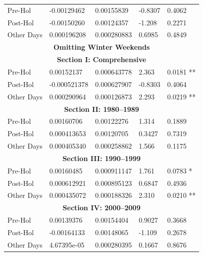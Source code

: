 \documentclass[11pt, english]{article}
\begin{document}
\begin{center}
\begin{longtable}{p{2cm}p{2cm}p{2cm}p{2cm}p{2cm}}
                \hline            
                Pre-Hol & -0.00129462 & 0.00155839 & -0.8307 & 0.4062\\ 
                Post-Hol & -0.00150260 & 0.00124357 & -1.208 & 0.2271\\  
                Other Days & 0.000196208 & 0.000280883 & 0.6985 & 0.4849\\
                \hline
                \hline                                          
                \multicolumn{5}{c}{\textbf{Omitting Winter Weekends}}\\ 
                \hline
                \hline
                \multicolumn{5}{c}{\textbf{Section I: Comprehensive}}\\
                \hline
                Pre-Hol & 0.00152137 & 0.000643778 & 2.363 & 0.0181 **\\
                Post-Hol & -0.000521378 & 0.000627907 & -0.8303 & 0.4064\\
                Other Days & 0.000290964 & 0.000126873 & 2.293 & 0.0219 **\\
                \hline
                \multicolumn{5}{c}{\textbf{Section II: 1980--1989}}\\
                \hline
                Pre-Hol & 0.00160706 & 0.00122276 & 1.314 & 0.1889\\
                Post-Hol & 0.000413653 & 0.00120705 & 0.3427 & 0.7319\\  
                Other Days & 0.000405340 & 0.000258862 & 1.566 & 0.1175\\
                \hline 
                \multicolumn{5}{c}{\textbf{Section III: 1990--1999}}\\   
                \hline            
                Pre-Hol & 0.00160485 & 0.000911147 & 1.761 & 0.0783 *\\ 
                Post-Hol & 0.000612921 & 0.000895123 & 0.6847 & 0.4936\\  
                Other Days & 0.000435072 & 0.000188326 & 2.310 & 0.0210 **\\
                \hline 
                \multicolumn{5}{c}{\textbf{Section IV: 2000--2009}}\\
                \hline                                          
                Pre-Hol & 0.00139376 & 0.00154404 & 0.9027 & 0.3668\\
                Post-Hol & -0.00164133 & 0.00148065 & -1.109 & 0.2678\\  
                Other Days & 4.67395e-05 & 0.000280395 & 0.1667 & 0.8676\\

\end{longtable}
\end{center}
\end{document}
